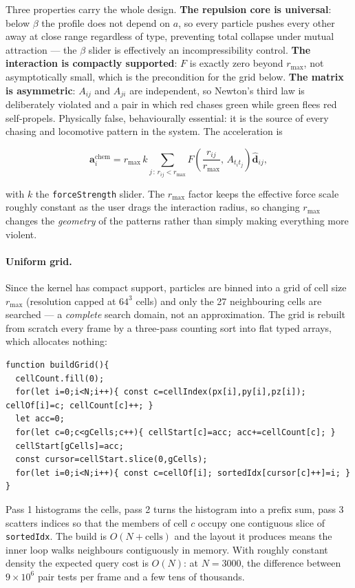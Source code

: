 \documentclass[10pt,a4paper]{article}
\newcommand{\code}[1]{\texttt{\small #1}}
\begin{document}
Three properties carry the whole design. \textbf{The repulsion core is universal}: below $\beta$ the
profile does not depend on $a$, so every particle pushes every other away at close range regardless of
type, preventing total collapse under mutual attraction --- the $\beta$ slider is effectively an
incompressibility control. \textbf{The interaction is compactly supported}: $F$ is exactly zero beyond
$r_{\max}$, not asymptotically small, which is the precondition for the grid below. \textbf{The matrix is
asymmetric}: $A_{ij}$ and $A_{ji}$ are independent, so Newton's third law is deliberately violated and a
pair in which red chases green while green flees red self-propels. Physically false, behaviourally
essential: it is the source of every chasing and locomotive pattern in the system. The acceleration is

\begin{equation}
\mathbf{a}_i^{\text{chem}} = r_{\max}\,k \!\!\sum_{j \,:\, r_{ij} < r_{\max}} \!\! F\!\left(\frac{r_{ij}}{r_{\max}},\, A_{t_i t_j}\right) \hat{\mathbf{d}}_{ij},
\end{equation}

\noindent with $k$ the \code{forceStrength} slider. The $r_{\max}$ factor keeps the effective force scale
roughly constant as the user drags the interaction radius, so changing $r_{\max}$ changes the
\emph{geometry} of the patterns rather than simply making everything more violent.

\paragraph{Uniform grid.} Since the kernel has compact support, particles are binned into a grid of cell
size $r_{\max}$ (resolution capped at $64^3$ cells) and only the 27 neighbouring cells are searched --- a
\emph{complete} search domain, not an approximation. The grid is rebuilt from scratch every frame by a
three-pass counting sort into flat typed arrays, which allocates nothing:

\begin{lstlisting}
function buildGrid(){
  cellCount.fill(0);
  for(let i=0;i<N;i++){ const c=cellIndex(px[i],py[i],pz[i]); cellOf[i]=c; cellCount[c]++; }
  let acc=0;
  for(let c=0;c<gCells;c++){ cellStart[c]=acc; acc+=cellCount[c]; }
  cellStart[gCells]=acc;
  const cursor=cellStart.slice(0,gCells);
  for(let i=0;i<N;i++){ const c=cellOf[i]; sortedIdx[cursor[c]++]=i; }
}
\end{lstlisting}

\noindent Pass 1 histograms the cells, pass 2 turns the histogram into a prefix sum, pass 3 scatters
indices so that the members of cell $c$ occupy one contiguous slice of \code{sortedIdx}. The build is
$O(N+\text{cells})$ and the layout it produces means the inner loop walks neighbours contiguously in
memory. With roughly constant density the expected query cost is $O(N)$: at $N=3000$, the difference
between $9\times10^6$ pair tests per frame and a few tens of thousands.
\end{document}
